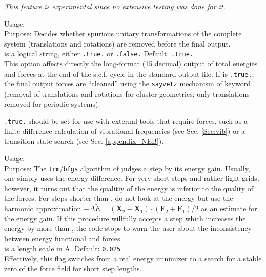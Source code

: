 \emph{This feature is experimental since no extensive testing was done for it.}

{
  \noindent
  Usage:   \\[1.0ex]
  Purpose: Decides whether spurious unitary transformations of the
    complete system (translations and rotations) are removed before
    the final output. \\[1.0ex]
   is a logical string, either \texttt{.true.} or
    \texttt{.false.} Default: \texttt{.true.} \\
}
This option affects directly the long-format (15 decimal) output of
total energies and forces at the end of the s.c.f. cycle in the standard
output file. If  is \texttt{.true.}, the final output
forces are ``cleaned'' using the \texttt{sayvetz}
  \cite{Eckart35,Sayvetz39} mechanism of keyword  
 (removal of translations and rotations for
cluster geometries; only translations removed for periodic systems). 

 \texttt{.true.} should be set for use
with external tools that require forces, such as a finite-difference
calculation of vibrational frequencies (see
Sec. \ref{Sec:vib}) or a transition state search (see 
Sec. \ref{appendix_NEB}). 

{
  \noindent
  Usage:   \\
  Purpose: The \texttt{trm}/\texttt{bfgs} algorithm of
   judges a step by its energy gain.  Usually, one
  simply uses the energy difference.  For very short steps and rather light
  grids, however, it turns out that the qualitiy of the energy is inferior to
  the quality of the forces.  For steps shorter than , do not
  look at the energy but use the harmonic approximation $- \Delta
  \tilde E = (\bm X_2-\bm X_1)\cdot(\bm F_2+\bm F_1)/2$ as an estimate for the
  energy gain.  If this procedure willfully accepts
  a step which increases the energy by more than ,
  the code stops to warn the user about the inconsistency between energy
  functional and forces.
  \\
   is a length scale in \AA. Default: \texttt{0.025} \\
}
Effectively, this flag switches from a real energy minimizer to a search for a
stable zero of the force field for short step lengths.


